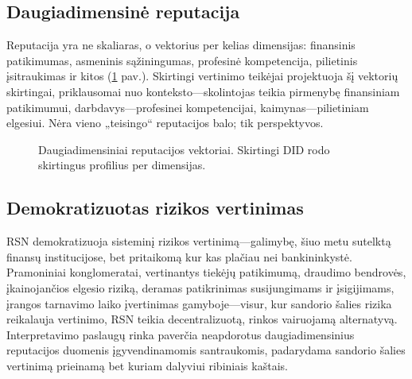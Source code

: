 \documentclass[11pt,a4paper,twocolumn]{article}
\begin{document}
\subsection{Daugiadimensinė reputacija}

Reputacija yra ne skaliaras, o vektorius per kelias dimensijas: finansinis patikimumas, asmeninis sąžiningumas, profesinė kompetencija, pilietinis įsitraukimas ir kitos (\ref{fig:reputation-radar} pav.). Skirtingi vertinimo teikėjai projektuoja šį vektorių skirtingai, priklausomai nuo konteksto---skolintojas teikia pirmenybę finansiniam patikimumui, darbdavys---profesinei kompetencijai, kaimynas---pilietiniam elgesiui. Nėra vieno „teisingo“ reputacijos balo; tik perspektyvos.

\begin{figure}[ht]
\centering
{}
\caption{Daugiadimensiniai reputacijos vektoriai. Skirtingi DID rodo skirtingus profilius per dimensijas.}
\label{fig:reputation-radar}
\end{figure}

\subsection{Demokratizuotas rizikos vertinimas}

RSN demokratizuoja sisteminį rizikos vertinimą---galimybę, šiuo metu sutelktą finansų institucijose, bet pritaikomą kur kas plačiau nei bankininkystė. Pramoniniai konglomeratai, vertinantys tiekėjų patikimumą, draudimo bendrovės, įkainojančios elgesio riziką, deramas patikrinimas susijungimams ir įsigijimams, įrangos tarnavimo laiko įvertinimas gamyboje---visur, kur sandorio šalies rizika reikalauja vertinimo, RSN teikia decentralizuotą, rinkos vairuojamą alternatyvą. Interpretavimo paslaugų rinka paverčia neapdorotus daugiadimensinius reputacijos duomenis įgyvendinamomis santraukomis, padarydama sandorio šalies vertinimą prieinamą bet kuriam dalyviui ribiniais kaštais.
\end{document}

